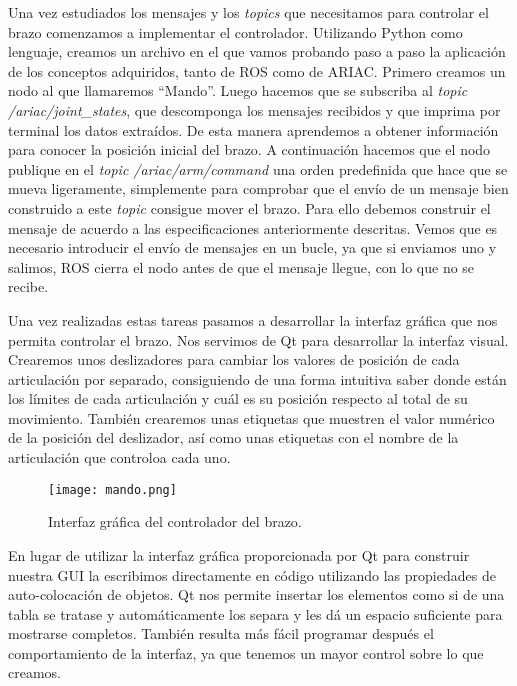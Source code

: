 Una vez estudiados los mensajes y los \textit{topics} que necesitamos para controlar el brazo comenzamos a implementar el controlador. Utilizando Python como lenguaje, creamos un archivo en el que vamos probando paso a paso la aplicación de los conceptos adquiridos, tanto de ROS como de ARIAC. 
Primero creamos un nodo al que llamaremos \textquotedblleft Mando\textquotedblright . Luego hacemos que se subscriba al \textit{topic} \textit{/ariac/joint\_states}, que descomponga los mensajes recibidos y que imprima por terminal los datos extraídos. De esta manera aprendemos a obtener información para conocer la posición inicial del brazo. 
A continuación hacemos que el nodo publique en el \textit{topic /ariac/arm/command} una orden predefinida que hace que se mueva ligeramente, simplemente para comprobar que el envío de un mensaje bien construido a este \textit{topic} consigue mover el brazo. Para ello debemos construir el mensaje de acuerdo a las especificaciones anteriormente descritas. Vemos que es necesario introducir el envío de mensajes en un bucle, ya que si enviamos uno y salimos, ROS cierra el nodo antes de que el mensaje llegue, con lo que no se recibe.

Una vez realizadas estas tareas pasamos a desarrollar la interfaz gráfica que nos permita controlar el brazo. Nos servimos de Qt para desarrollar la interfaz visual. Crearemos unos deslizadores para cambiar los valores de posición de cada articulación por separado, consiguiendo de una forma intuitiva saber donde están los límites de cada articulación y cuál es su posición respecto al total de su movimiento. También crearemos unas etiquetas que muestren el valor numérico de la posición del deslizador, así como unas etiquetas con el nombre de la articulación que controloa cada uno. 

\begin{figure}[]
	\centering\texttt{[image: mando.png]}
	\caption{Interfaz gráfica del controlador del brazo.}
	\label{fig:mando}
\end{figure}

En lugar de utilizar la interfaz gráfica proporcionada por Qt para construir nuestra GUI la escribimos directamente en código utilizando las propiedades de auto-colocación de objetos. Qt nos permite insertar los elementos como si de una tabla se tratase y automáticamente los separa y les dá un espacio suficiente para mostrarse completos. También resulta más fácil programar después el comportamiento de la interfaz, ya que tenemos un mayor control sobre lo que creamos. 

